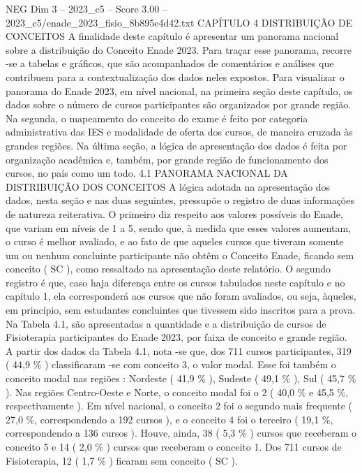 \begin{textsample}{NEG Dim 3 – 2023\_c5 – Score 3.00 – 2023\_c5/enade\_2023\_fisio\_8b895e4d42.txt}  \label{ex:f3_neg_225}
CAPÍTULO 4 DISTRIBUIÇÃO DE CONCEITOS A finalidade deste capítulo é apresentar um panorama nacional sobre a distribuição do Conceito Enade 2023.
Para traçar esse panorama, recorre -se a tabelas e gráficos, que são acompanhados de comentários e análises que contribuem para a contextualização dos dados neles expostos.
Para visualizar o panorama do Enade 2023, em nível nacional, na primeira seção deste capítulo, os dados sobre o número de cursos participantes são organizados por grande região.
Na segunda, o mapeamento do conceito do exame é feito por categoria administrativa das IES e modalidade de oferta dos cursos, de maneira cruzada às grandes regiões.
Na última seção, a lógica de apresentação dos dados é feita por organização acadêmica e, também, por grande região de funcionamento dos cursos, no país como um todo. 4.1 PANORAMA NACIONAL DA DISTRIBUIÇÃO DOS CONCEITOS A lógica adotada na apresentação dos dados, nesta seção e nas duas seguintes, pressupõe o registro de duas informações de natureza reiterativa.
O primeiro diz respeito aos valores possíveis do Enade, que variam em níveis de 1 a 5, sendo que, à medida que esses valores aumentam, o curso é melhor avaliado, e ao fato de que aqueles cursos que tiveram somente um ou nenhum concluinte participante não obtêm o Conceito Enade, ficando sem conceito ( SC ), como ressaltado na apresentação deste relatório.
O segundo registro é que, caso haja diferença entre os cursos tabulados neste capítulo e no capítulo 1, ela corresponderá aos cursos que não foram avaliados, ou seja, àqueles, em princípio, sem estudantes concluintes que tivessem sido inscritos para a prova.
Na Tabela 4.1, são apresentadas a quantidade e a distribuição de cursos de Fisioterapia participantes do Enade 2023, por faixa de conceito e grande região.
A partir dos dados da Tabela 4.1, nota -se que, dos 711 cursos participantes, 319 ( 44,9 \% ) classificaram -se com conceito 3, o valor modal.
Esse foi também o conceito modal nas regiões : Nordeste ( 41,9 \% ), Sudeste ( 49,1 \% ), Sul ( 45,7 \% ).
Nas regiões Centro-Oeste e Norte, o conceito modal foi o 2 ( 40,0 \% e 45,5 \%, respectivamente ).
Em nível nacional, o conceito 2 foi o segundo mais frequente ( 27,0 \%, correspondendo a 192 cursos ), e o conceito 4 foi o terceiro ( 19,1 \%, correspondendo a 136 cursos ).
Houve, ainda, 38 ( 5,3 \% ) cursos que receberam o conceito 5 e 14 ( 2,0 \% ) cursos que receberam o conceito 1.
Dos 711 cursos de Fisioterapia, 12 ( 1,7 \% ) ficaram sem conceito ( SC ).

\end{textsample}
